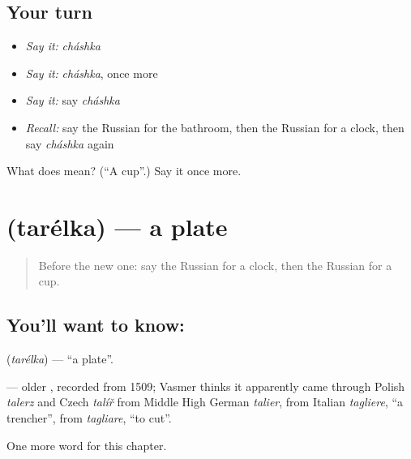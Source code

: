 \subsection*{Your turn}
\begin{itemize}
\raggedright
  \item \emph{Say it:} \emph{cháshka}
  \item \emph{Say it:} \emph{cháshka}, once more
  \item \emph{Say it:} say \emph{cháshka}
  \item \emph{Recall:} say the Russian for the bathroom, then the Russian for a clock, then say \emph{cháshka} again
\end{itemize}

\begin{tcolorbox}[breakable,colback=teal!4,colframe=teal!35!black,title={Before you move on}]
What does  mean? (\textquotedblleft{}A cup\textquotedblright{}.) Say it once more.
\end{tcolorbox}
\section[\texorpdfstring{\ru{тарелка} (tarélka)}{тарелка (tarélka)}]{ (tarélka) — a plate}

\label{lesson:RU-C51-plate}



\begin{quote}
Before the new one: say the Russian for a clock, then the Russian for a cup.
\end{quote}

\subsection*{You'll want to know: }
\textbf{} (\emph{tarélka}) — \textquotedblleft{}a plate\textquotedblright{}.

\begin{cousinweb}
\textbf{} — older \emph{}, recorded from 1509; Vasmer thinks it apparently came through Polish \emph{talerz} and Czech \emph{talíř} from Middle High German \emph{talier}, from Italian \emph{tagliere}, \textquotedblleft{}a trencher\textquotedblright{}, from \emph{tagliare}, \textquotedblleft{}to cut\textquotedblright{}.
\end{cousinweb}

\begin{grammarlens}[title={What you've built}]
One more word for this chapter.
\end{grammarlens}

